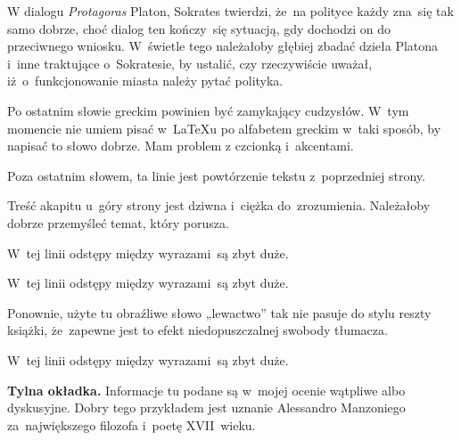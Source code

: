 \documentclass[a4paper,11pt]{article}
\begin{document}
\start {} W dialogu \emph{Protagoras} Platon, Sokrates
twierdzi, że~na polityce każdy zna~się tak samo dobrze, choć dialog
ten kończy~się sytuacją, gdy dochodzi on do przeciwnego wniosku.
W~świetle tego należałoby głębiej zbadać dzieła Platona i~inne
traktujące o~Sokratesie, by ustalić, czy rzeczywiście uważał,
iż~o~funkcjonowanie miasta należy pytać polityka.

\vspace{\spaceFour}


\start {} Po ostatnim słowie greckim powinien być
zamykający cudzysłów. W~tym momencie nie umiem pisać w~\LaTeX u po
alfabetem greckim w~taki sposób, by napisać to słowo dobrze. Mam
problem z czcionką i~akcentami.

\vspace{\spaceFour}


\start {} Poza ostatnim słowem, ta linie jest powtórzenie
tekstu z~poprzedniej strony.

\vspace{\spaceFour}


\start {} Treść akapitu u~góry strony jest dziwna i~ciężka
do~zrozumienia. Należałoby dobrze przemyśleć temat, który porusza.

\vspace{\spaceFour}


\start {} W~tej linii odstępy między wyrazami~są zbyt
duże.

\vspace{\spaceFour}


\start {} W~tej linii odstępy między wyrazami~są zbyt
duże.

\vspace{\spaceFour}


\start {} Ponownie, użyte tu obraźliwe słowo „lewactwo”
tak nie pasuje do stylu reszty książki, że~zapewne jest to efekt
niedopuszczalnej swobody tłumacza.

\vspace{\spaceFour}


\start {} W~tej linii odstępy między wyrazami~są zbyt
duże.

\vspace{\spaceFour}


\start \textbf{Tylna okładka.} Informacje tu podane są w~mojej ocenie
wątpliwe albo dyskusyjne. Dobry tego przykładem jest uznanie
Alessandro Manzoniego za~największego filozofa i~poetę XVII~wieku.
\end{document}

